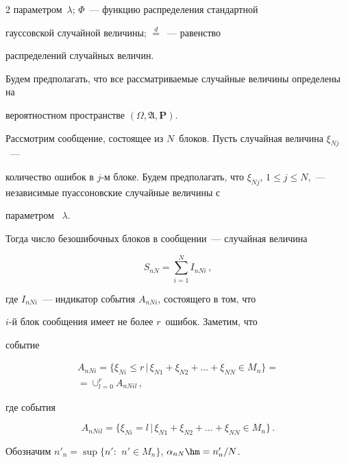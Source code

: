 \begin{multicols}{2}
параметром~$\lambda$; $\Phi$~--- функцию распределения стандартной


гауссовской случайной величины; $\stackrel{d}{=}$~--- равенство


распределений случайных величин.


 Будем предполагать, что все рассматриваемые случайные величины определены на


вероятностном пространстве $(\Omega,


\mathfrak{A}, \mathbf{P})$.








 Рассмотрим  сообщение, состоящее из $N$~блоков. Пусть случайная величина $\xi_{Nj}$~--- 


 количество ошибок в $j$-м блоке. Будем предполагать, что  $\xi_{Nj}$, $1\le


j\le N$,~--- независимые пуассоновские случайные величины с


параметром~ $\lambda$.


  Тогда  число безошибочных  блоков в сообщении~--- случайная величина


$$


S_{nN}=\sum\limits_{i=1}^NI_{nNi}\,,


$$


где $I_{nNi}$~--- индикатор события $A_{nNi}$, состоящего в том, что


$i$-й блок  сообщения имеет не более $r$~ошибок. Заметим, что


событие


\begin{multline*} 


A_{nNi}=\{\xi_{Ni}\le r\, |\, \xi_{N1}+\xi_{N2}+ \dots +\xi_{NN}\in


M_n\}={}\\


{}=\cup_{l=0}^r A_{nNil}\,,


\end{multline*}


где   события


$$ 


A_{nNil}=\{\xi_{Ni}=l\, |\,


 \xi_{N1}+\xi_{N2}+ \dots +\xi_{NN}\in M_n\}\,.


$$





Обозначим $n'_n=\sup\{n':\ \, n'\in M_n\}$, $\alpha_{nN}\hm={n'_n}/{N}$.






\end{multicols}
